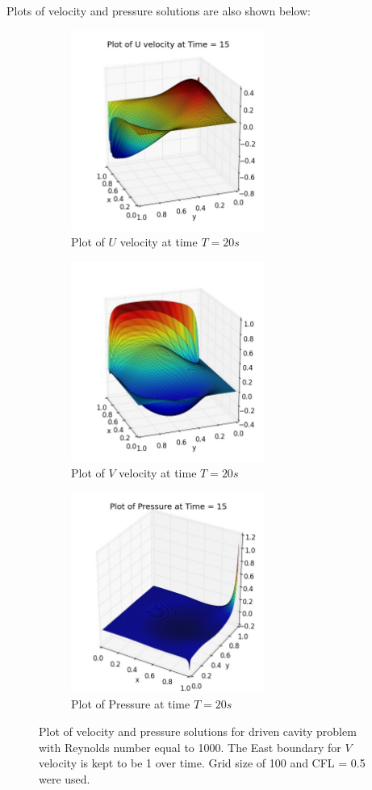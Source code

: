 Plots of velocity and pressure solutions are also shown below:
\begin{figure}[H]
	\centering
	\begin{subfigure}[t]{2.5in}
		\centering
		\includegraphics[width=2.5in]{figures/Gauge_dcv_uf_grid_120.jpg}
		\caption{Plot of $U$ velocity at time $T = 20s$}\label{fig:6.21a}		
	\end{subfigure}
	\quad
	\begin{subfigure}[t]{2.5in}
		\centering
		\includegraphics[width=2.5in]{figures/Gauge_dcv_vf_grid_120.jpg}
		\caption{Plot of $V$ velocity at time $T = 20s$}\label{fig:6.21b}
	\end{subfigure}
	\quad
	\centering
	\begin{subfigure}[t]{3.5in}
		\centering
		\includegraphics[width=2.5in]{figures/Gauge_dcv_pf_grid_120.jpg}
		\caption{Plot of Pressure at time $T = 20s$}\label{fig:6.21c}		
	\end{subfigure}
	\caption{Plot of velocity and pressure solutions for driven cavity problem with Reynolds number equal to 1000. The East boundary for $V$ velocity is kept to be 1 over time. Grid size of 100 and CFL = 0.5 were used.}\label{fig:6.16}
\end{figure}


